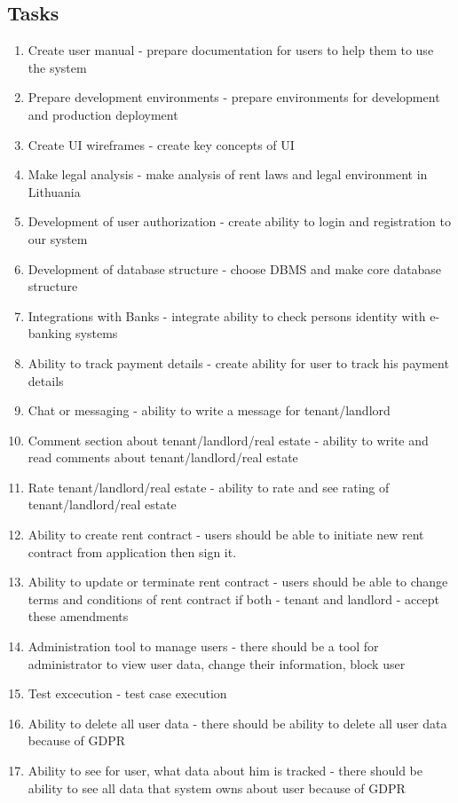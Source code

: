 \documentclass{VUMIFPSkursinis}
\begin{document}
	\subsection{Tasks}
	\begin{enumerate}
		\item{Create user manual} - prepare documentation for users to help them to use the system
		\item{Prepare development environments} - prepare environments for development and production deployment
		\item{Create UI wireframes} - create key concepts of UI
		\item{Make legal analysis} - make analysis of rent laws and legal environment in Lithuania
		\item{Development of user authorization} - create ability to login and registration to our system
		\item{Development of database structure} - choose DBMS and make core database structure
		\item{Integrations with Banks} - integrate ability to check persons identity with e-banking systems
		\item{Ability to track payment details} - create ability for user to track his payment details
		\item{Chat or messaging} - ability to write a message for tenant/landlord
		\item{Comment section about tenant/landlord/real estate} - ability to write and read comments about tenant/landlord/real estate
		\item{Rate tenant/landlord/real estate} - ability to rate and see rating of tenant/landlord/real estate
		\item{Ability to create rent contract} - users should be able to initiate new rent contract from application then sign it.
		\item{Ability to update or terminate rent contract} - users should be able to change terms and conditions of rent contract if both - tenant and landlord - accept these amendments
		\item{Administration tool to manage users} - there should be a tool for administrator to view user data, change their information, block user
		\item{Test excecution} - test case execution
		\item{Ability to delete all user data} - there should be ability to delete all user data because of GDPR
		\item{Ability to see for user, what data about him is tracked} - there should be ability to see all data that system owns about user because of GDPR

\end{enumerate}
\end{document}
